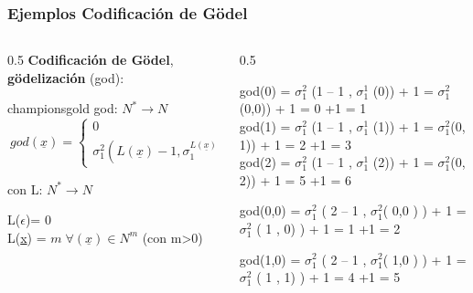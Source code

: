 \documentclass[xcolor=table]{beamer}
\begin{document}
\begin{frame}[fragile]\frametitle{Ejemplos Codificación de Gödel} \scriptsize


\begin{columns}

    \begin{column}{0.5\textwidth}
     \textbf{Codificación de Gödel}, \textbf{gödelización} (god):

         \begin{colorblock}[black]{championsgold}{}\scriptsize
        god: $N^* \rightarrow N$
          \[\  god(\underline{x}) = \left\{ 
          \begin{array}{lr} 
              0 & si\; L(\underline{x}) = 0\\ 
              \sigma^2_{1}(L(\underline{x})-1, \sigma^{L(\underline{x})}_{1}(\underline{x})) +1 & si\; L(\underline{x}) \neq 0 
          \end{array} \right. \]


          con  L: $N^* \rightarrow N$

         \hspace{0.5cm}  L($\epsilon$)= 0\\
         \hspace{0.5cm}  L(\underline{x}) = $m \;\forall (\underline{x}) \in N^m$ (con m>0)
        \end{colorblock}

   
         
    
    \end{column}

    \begin{column}{0.5\textwidth}


god(0) = $\sigma^2_1$ (1 – 1 , $\sigma^1_1$ (0)) + 1 = $\sigma^2_1$(0,0)) + 1 = 0 +1 = 1\\
god(1) = $\sigma^2_1$ (1 – 1 , $\sigma^1_1$ (1)) + 1 = $\sigma^2_1$(0, 1)) + 1 = 2 +1 = 3\\
god(2) = $\sigma^2_1$ (1 – 1 , $\sigma^1_1$ (2)) + 1 = $\sigma^2_1$(0, 2)) + 1 = 5 +1 = 6\\

\hspace{2cm}

god(0,0) =  $\sigma^2_1$ ( 2 – 1 , $\sigma^2_1$( 0,0 ) ) + 1 =  $\sigma^2_1$ ( 1 , 0) ) + 1 = 1 +1 = 2

god(1,0) =  $\sigma^2_1$ ( 2 – 1 , $\sigma^2_1$( 1,0 ) ) + 1 =  $\sigma^2_1$ ( 1 , 1) ) + 1 = 4 +1 = 5

    \end{column}
    
\end{columns}


\end{frame}
\end{document}
